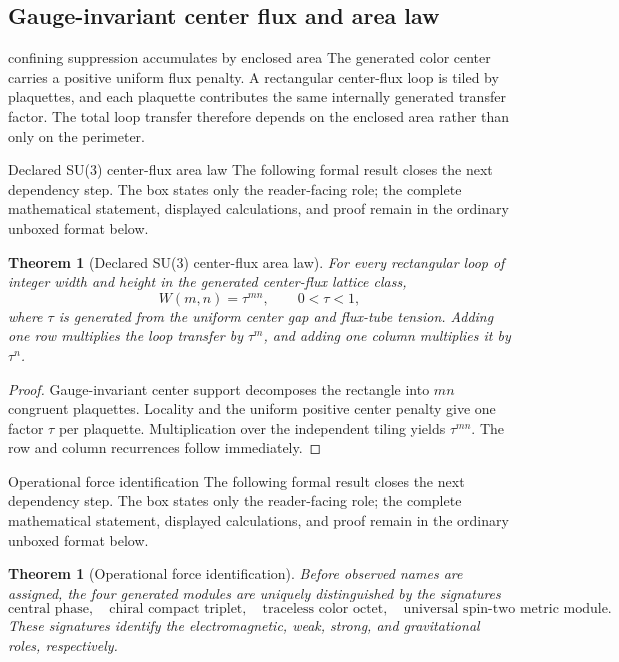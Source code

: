 \documentclass[11pt]{article}
\numberwithin{equation}{section}
\newtheorem{theorem}[definition]{Theorem}
\theoremstyle{remark}
\begin{document}
\subsection{Gauge-invariant center flux and area law}
\begin{interpretivebridge}{confining suppression accumulates by enclosed area}
The generated color center carries a positive uniform flux penalty. A rectangular center-flux loop is tiled by plaquettes, and each plaquette contributes the same internally generated transfer factor. The total loop transfer therefore depends on the enclosed area rather than only on the perimeter.
\end{interpretivebridge}
\begin{proofguide}{Declared SU(3) center-flux area law}
The following formal result closes the next dependency step. The box states only the reader-facing role; the complete mathematical statement, displayed calculations, and proof remain in the ordinary unboxed format below.
\end{proofguide}
\begin{theorem}[Declared SU(3) center-flux area law]
For every rectangular loop of integer width and height in the generated center-flux lattice class,
\begin{equation}
W(m,n)=\tau^{mn},\qquad 0<\tau<1,
\end{equation}
where $\tau$ is generated from the uniform center gap and flux-tube tension. Adding one row multiplies the loop transfer by $\tau^m$, and adding one column multiplies it by $\tau^n$.
\end{theorem}
\begin{proof}
Gauge-invariant center support decomposes the rectangle into $mn$ congruent plaquettes. Locality and the uniform positive center penalty give one factor $\tau$ per plaquette. Multiplication over the independent tiling yields $\tau^{mn}$. The row and column recurrences follow immediately.
\end{proof}
\begin{proofguide}{Operational force identification}
The following formal result closes the next dependency step. The box states only the reader-facing role; the complete mathematical statement, displayed calculations, and proof remain in the ordinary unboxed format below.
\end{proofguide}
\begin{theorem}[Operational force identification]
Before observed names are assigned, the four generated modules are uniquely distinguished by the signatures
\begin{equation}
\text{central phase},\quad
\text{chiral compact triplet},\quad
\text{traceless color octet},\quad
\text{universal spin-two metric module}.
\end{equation}
These signatures identify the electromagnetic, weak, strong, and gravitational roles, respectively.
\end{theorem}
\end{document}
